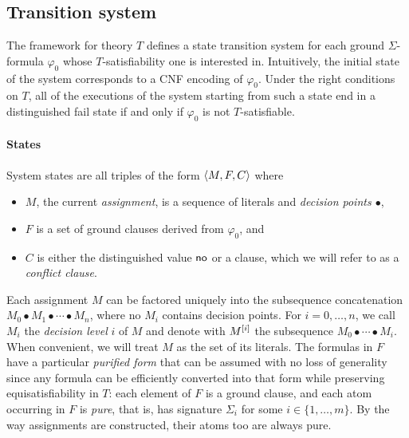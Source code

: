 \documentclass{svjour3}                     %
\begin{document}
\subsection{Transition system}

The \dpllts framework for theory $T$ defines a state transition system
for each ground $\Sigma$-formula $\varphi_0$ whose $T$-satisfiability one is interested in.
Intuitively, the initial state of the system corresponds to a CNF encoding of $\varphi_0$. 
Under the right conditions on $T$, all of the
executions of the system starting from such a state end in a distinguished 
fail state if and only if $\varphi_0$ is not $T$-satisfiable.

\paragraph{States}
System states are all triples of the form $\langle M,F,C \rangle$
where
\begin{itemize}
\item
$M$, the current \emph{assignment}, is a sequence of literals and 
\emph{decision points $\bullet$},
\item
$F$ is a set of ground clauses derived from $\varphi_0$, and 
\item
$C$ is either the distinguished value $\mathsf{no}$ or a clause, which we will refer to as a \emph{conflict clause}.
\end{itemize}

\noindent
Each assignment $M$ can be factored uniquely into 
the subsequence concatenation $M_0\bullet M_1 \bullet \cdots \bullet M_n$,
where no $M_i$ contains decision points.
For $i=0,\ldots,n$, we call $M_i$ the \emph{decision level} $i$ of $M$ and
denote with ${M}^{[i]}$ the subsequence $M_0\bullet \cdots \bullet M_i$.
When convenient, we will treat $M$ as the set of its literals.
The formulas in $F$ have a particular \emph{purified form}
that can be assumed with no loss of generality
since any formula can be efficiently converted into 
that form while preserving equisatisfiability in $T$:
each element of $F$ is a ground clause,
and each atom occurring in $F$ is \emph{pure},
that is, has signature $\Sigma_i$ for some $i\in \{1, \ldots, m\}$.
By the way assignments are constructed, their atoms too are always pure.
\end{document}
